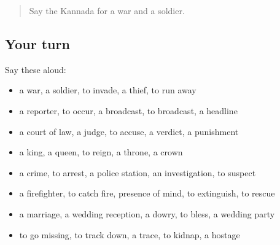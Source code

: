 \label{lesson:KA-R326-review-319-326}



\begin{quote}
Say the Kannada for a war and a soldier.
\end{quote}

\subsection*{Your turn}
Say these aloud:

\begin{itemize}
\raggedright
  \item a war, a soldier, to invade, a thief, to run away
  \item a reporter, to occur, a broadcast, to broadcast, a headline
  \item a court of law, a judge, to accuse, a verdict, a punishment
  \item a king, a queen, to reign, a throne, a crown
  \item a crime, to arrest, a police station, an investigation, to suspect
  \item a firefighter, to catch fire, presence of mind, to extinguish, to rescue
  \item a marriage, a wedding reception, a dowry, to bless, a wedding party
  \item to go missing, to track down, a trace, to kidnap, a hostage
\end{itemize}

